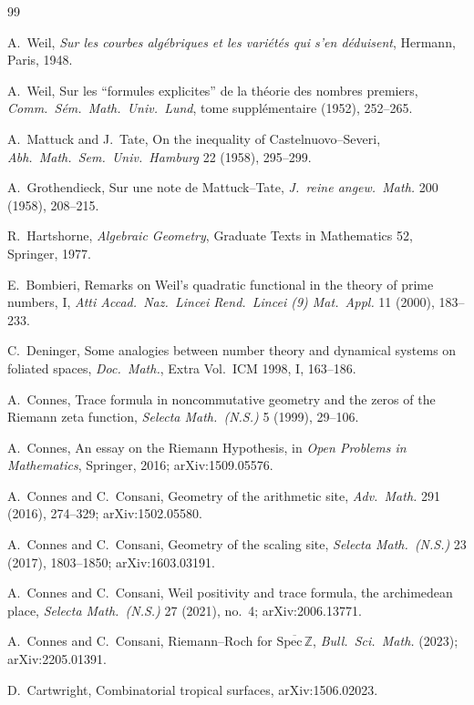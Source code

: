 \documentclass[11pt]{article}
\theoremstyle{definition}
\begin{document}
\begin{thebibliography}{99}\small

 A.~Weil, \emph{Sur les courbes alg\'ebriques et les vari\'et\'es qui s'en d\'eduisent}, Hermann, Paris, 1948.

 A.~Weil, Sur les ``formules explicites'' de la th\'eorie des nombres premiers, \emph{Comm.\ S\'em.\ Math.\ Univ.\ Lund}, tome suppl\'ementaire (1952), 252--265.

 A.~Mattuck and J.~Tate, On the inequality of Castelnuovo--Severi, \emph{Abh.\ Math.\ Sem.\ Univ.\ Hamburg} 22 (1958), 295--299.

 A.~Grothendieck, Sur une note de Mattuck--Tate, \emph{J.\ reine angew.\ Math.} 200 (1958), 208--215.

 R.~Hartshorne, \emph{Algebraic Geometry}, Graduate Texts in Mathematics 52, Springer, 1977.

 E.~Bombieri, Remarks on Weil's quadratic functional in the theory of prime numbers, I, \emph{Atti Accad.\ Naz.\ Lincei Rend.\ Lincei (9) Mat.\ Appl.} 11 (2000), 183--233.

 C.~Deninger, Some analogies between number theory and dynamical systems on foliated spaces, \emph{Doc.\ Math.}, Extra Vol.\ ICM 1998, I, 163--186.

 A.~Connes, Trace formula in noncommutative geometry and the zeros of the Riemann zeta function, \emph{Selecta Math.\ (N.S.)} 5 (1999), 29--106.

 A.~Connes, An essay on the Riemann Hypothesis, in \emph{Open Problems in Mathematics}, Springer, 2016; arXiv:1509.05576.

 A.~Connes and C.~Consani, Geometry of the arithmetic site, \emph{Adv.\ Math.} 291 (2016), 274--329; arXiv:1502.05580.

 A.~Connes and C.~Consani, Geometry of the scaling site, \emph{Selecta Math.\ (N.S.)} 23 (2017), 1803--1850; arXiv:1603.03191.

 A.~Connes and C.~Consani, Weil positivity and trace formula, the archimedean place, \emph{Selecta Math.\ (N.S.)} 27 (2021), no.~4; arXiv:2006.13771.

 A.~Connes and C.~Consani, Riemann--Roch for $\overline{\mathrm{Spec}\,\mathbb{Z}}$, \emph{Bull.\ Sci.\ Math.} (2023); arXiv:2205.01391.

 D.~Cartwright, Combinatorial tropical surfaces, arXiv:1506.02023.


\end{thebibliography}
\end{document}
